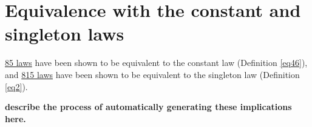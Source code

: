 \chapter{Equivalence with the constant and singleton laws}

\href{https://github.com/teorth/equational_theories/blob/main/equational_theories/Generated/Constant.lean}{85 laws} have been shown to be equivalent to the constant law (Definition \ref{eq46}), and \href{https://github.com/teorth/equational_theories/blob/main/equational_theories/Generated/Singleton.lean}{815 laws} have been shown to be equivalent to the singleton law (Definition \ref{eq2}).

{\bf describe the process of automatically generating these implications here.}
